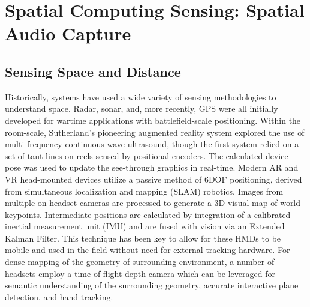 \documentclass [11pt, proquest] {uwthesis}[2020/02/24]
\begin{document}














\section{Spatial Computing Sensing: Spatial Audio Capture} 

\subsection{Sensing Space and Distance}

Historically, systems have used a wide variety of sensing methodologies to understand space. Radar, sonar, and, more recently, GPS were all initially developed for wartime applications with battlefield-scale positioning. Within the room-scale, Sutherland's pioneering augmented reality system explored the use of multi-frequency continuous-wave ultrasound, though the first system relied on a set of taut lines on reels sensed by positional encoders. The calculated device pose was used to update the see-through graphics in real-time. Modern AR and VR head-mounted devices utilize a passive method of 6DOF positioning, derived from simultaneous localization and mapping (SLAM) robotics. Images from multiple on-headset cameras are processed to generate a 3D visual map of world keypoints. Intermediate positions are calculated by integration of a calibrated inertial measurement unit (IMU) and are fused with vision via an Extended Kalman Filter. This technique has been key to allow for these HMDs to be mobile and used in-the-field without need for external tracking hardware. For dense mapping of the geometry of surrounding environment, a number of headsets employ a time-of-flight depth camera which can be leveraged for semantic understanding of the surrounding geometry, accurate interactive plane detection, and hand tracking. %
\end{document}
